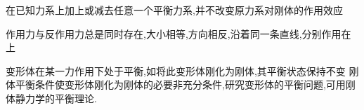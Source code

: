 \begin{theorem}[加减平衡力系原理]
    在已知力系上加上或减去任意一个平衡力系,并不改变原力系对刚体的作用效应
\end{theorem}
\begin{inference}[刚体力的可传性]

\end{inference}

\begin{theorem}[作用力和反作用力定律]
    作用力与反作用力总是同时存在,大小相等,方向相反,沿着同一条直线,分别作用在上
\end{theorem}

\begin{theorem}[刚化原理]
    变形体在某一力作用下处于平衡,如将此变形体刚化为刚体,其平衡状态保持不变
    刚体平衡条件使变形体刚化为刚体的必要非充分条件,研究变形体的平衡问题,可用刚体静力学的平衡理论.
\end{theorem}